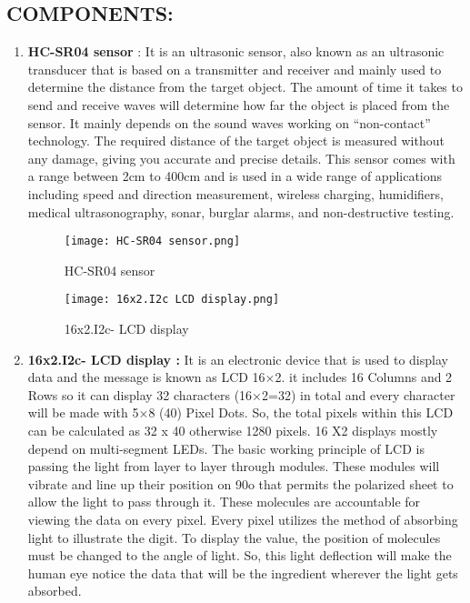\documentclass[12pt,letterpaper]{article}
\begin{document}
\subsection{COMPONENTS:}
\begin{enumerate}
    
    \item \textbf{HC-SR04 sensor} : It is an ultrasonic sensor, also known as an ultrasonic transducer that is based on a transmitter and receiver and mainly used to determine the distance from the target object. The amount of time it takes to send and receive waves will determine how far the object is placed from the sensor. It mainly depends on the sound waves working on “non-contact” technology. The required distance of the target object is measured without any damage, giving you accurate and precise details. This sensor comes with a range between 2cm to 400cm and is used in a wide range of applications including speed and direction measurement, wireless charging, humidifiers, medical ultrasonography, sonar, burglar alarms, and non-destructive testing.
    \begin{figure}[h!]
        \centering
        \texttt{[image: HC-SR04 sensor.png]}
        \caption{HC-SR04 sensor}
        \label{fig:image3}
    \end{figure}
    
    \begin{figure}[h!]
        \centering
        \texttt{[image: 16x2.I2c LCD display.png]}
        \caption{16x2.I2c- LCD display}
        \label{fig:image3}
    \end{figure}
    \item \textbf{16x2.I2c- LCD display :}  It is an electronic device that is used to display data and the message is known as LCD 16×2.  it includes 16 Columns and 2 Rows so it can display 32 characters (16×2=32) in total and every character will be made with 5×8 (40) Pixel Dots. So, the total pixels within this LCD can be calculated as 32 x 40 otherwise 1280 pixels. 16 X2 displays mostly depend on multi-segment LEDs. The basic working principle of LCD is passing the light from layer to layer through modules. These modules will vibrate and line up their position on 90o that permits the polarized sheet to allow the light to pass through it. These molecules are accountable for viewing the data on every pixel. Every pixel utilizes the method of absorbing light to illustrate the digit. To display the value, the position of molecules must be changed to the angle of light. So, this light deflection will make the human eye notice the data that will be the ingredient wherever the light gets absorbed.
    

\end{enumerate}
\end{document}
